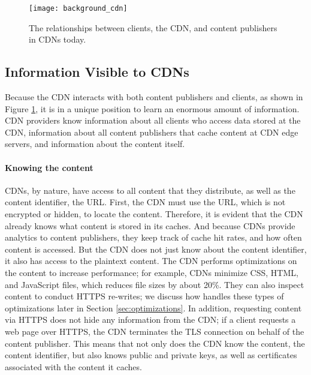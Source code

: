 \begin{figure}[t]
\centering
\texttt{[image: background\_cdn]}
\caption{The relationships between clients, the CDN, and content publishers in 
CDNs today.}
\label{fig:basic_cdn}
\end{figure}

\subsection{Information Visible to CDNs}

Because the CDN interacts with both content publishers and clients, as shown in Figure \ref{fig:basic_cdn}, it is in a unique position 
to learn an enormous amount of information.  CDN providers know information about all clients who
access data stored at the CDN, information about all content publishers that cache content at 
CDN edge servers, and information about the content itself.

\paragraph{Knowing the content}  CDNs, by nature, have access to all content that they distribute, as well as the 
content identifier, the URL.  First, the CDN must use the URL, which is not 
encrypted or hidden, to locate the content. Therefore, it is evident that the CDN already knows what content is 
stored in its caches.  And because CDNs provide analytics to content publishers, they keep track of cache hit 
rates, and how often content is accessed.  But the CDN does not just know about the content identifier, it also 
has access to the plaintext content.  The CDN performs optimizations on the content to increase performance; 
for example, CDNs minimize CSS, HTML, and JavaScript files, which reduces file sizes by about 20\%.  They can 
also inspect content to conduct HTTPS re-writes; we discuss how \system{} handles these types of optimizations later 
in Section \ref{sec:optimizations}. In addition, requesting content via HTTPS does not hide any information 
from the CDN; if a client requests a web page over HTTPS, the CDN terminates the TLS connection on behalf of the 
content publisher.  This means that not only does the CDN know the content, the content identifier, but also knows 
public and private keys, as well as certificates associated with the content it caches.  


